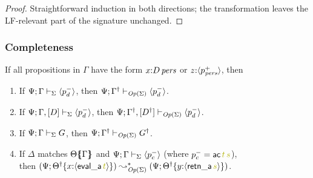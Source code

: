 \begin{proof}
Straightforward induction in both directions; the transformation 
leaves the LF-relevant part of the signature unchanged.
\end{proof}

\subsubsection{Completeness}

\begin{theorem}\label{thm:opercomp}
If all propositions in $\Gamma$ have the form 
$x{:}{D}\,{{\it pers}}$ or $z{:}\langle {p^+_{{\it pers}}} \rangle$, then
\begin{enumerate}
\item  
If ${\Psi}; {\Gamma} \vdash_{\Sigma} {\langle {p^-_d} \rangle}$,
then ${\Psi}; {{{\Gamma}^\dag}} \vdash_{{\it Op}({\Sigma})} {\langle {p^-_d} \rangle}$.
\item  
If ${\Psi}; {\Gamma, [D]} \vdash_{\Sigma} {\langle {p^-_d} \rangle}$,
then ${\Psi}; {{{\Gamma}^\dag}, [{{D}^\dag}]} \vdash_{{\it Op}({\Sigma})} {\langle {p^-_d} \rangle}$.
\item  
If ${\Psi}; {\Gamma} \vdash_{\Sigma} {G}$,
then ${\Psi}; {{{\Gamma}^\dag}} \vdash_{{\it Op}({\Sigma})} {{{G}^\dag}}$.
\item
If $\Delta$ matches ${\Theta}\mbox{$\{\hspace{-4pt}\{$}{\Gamma}\mbox{$\}\hspace{-4pt}\}$}$ 
and ${\Psi}; {\Gamma} \vdash_{\Sigma} {\langle {p^-_c} \rangle}$
(where $p^-_c = {\sf ac}\,\lf{t}\,\lf{s}$),\\
then
$(\Psi; \tackon{\opsubst{\Theta}}{x{:}\susp{{\sf eval\_a}\,\lf{t}}}) 
  \leadsto^*_{\transop{\Sigma}}
 (\Psi; \tackon{\opsubst{\Theta}}{y{:}\susp{{\sf retn\_a}\,\lf{s}}})$.
\end{enumerate}
\end{theorem}

